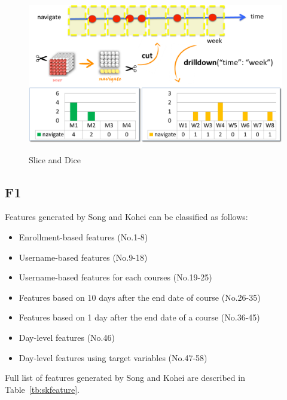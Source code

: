 \begin{figure}[!t]
	\caption{Slice and Dice}
	\centering
	\includegraphics[width=0.5 \textwidth]{slice_and_dice}
	\label{fig:slice}
\end{figure}

\subsection{F1}

Features generated by Song and Kohei can be classified as follows:

\begin{itemize}
  \setlength\itemsep{0em}
  \item Enrollment-based features (No.1-8)
  \item Username-based features (No.9-18)
  \item Username-based features for each courses (No.19-25) 
  \item Features based on 10 days after the end date of course (No.26-35)
  \item Features based on 1 day after the end date of a course (No.36-45)
  \item Day-level features (No.46)
  \item Day-level features using target variables (No.47-58)
\end{itemize}

Full list of features generated by Song and Kohei are described in Table~\ref{tb:skfeature}.

